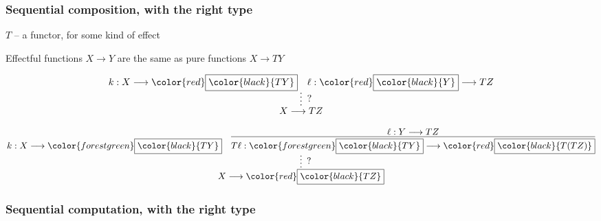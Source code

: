 \documentclass[aspectratio=169,11pt]{beamer}
\newcommand{\inl}{\textsf{inl}}
\newcommand{\inr}{\textsf{inr}}
\newcommand{\K}{^\mathrm{k}}
\newcommand{\tto}{\longrightarrow}
\newcommand{\ttoK}{\longrightarrow\K}
\newcommand{\id}{\textsf{id}}
\newcommand{\seq}{\mathbin{\triangleright}}
\newcommand{\idK}{\mathsf{id}^{\tiny \blacktriangleright}}
\newcommand{\seqK}{\mathbin{\blacktriangleright}}
\newcommand{\ns}[1]{}
\newcommand{\greenb}[1]{{\color{forestgreen}\boxed{\color{black}{#1}}}}
\newcommand{\redb}[1]{{\color{red}\boxed{\color{black}{#1}}}}
\newcommand{\blue}[1]{\textcolor{blue}{#1}}
\begin{document}
  













\begin{frame}

\frametitle{Sequential composition, with the right type}
  
$T$ -- a functor, for some kind of effect

Effectful functions $X \to Y$ are the same as pure functions $X \to T Y$

  
\[    
  \infer*[?]{\ns{k \seqK \ell = ? :} X \tto T Z}{
    k : X \tto \redb{T Y} 
    &
    \ell : \redb{Y} \tto T Z
  }
\]

\[    
  \infer*[?]{\ns{k \seqK \ell = ? :} X \tto \redb{T Z}}{
    k : X \tto \greenb{T Y} 
    &
    \infer{T \ell : \greenb{T Y} \tto \redb{T (T Z)}}{
      \ell : Y \tto T Z
    }  
  }
\]

\end{frame}

\frametitle{Sequential computation, with the right type}
\end{document}
